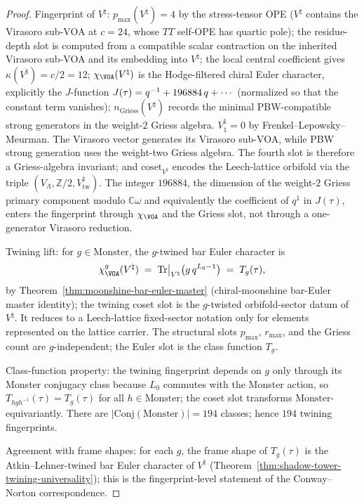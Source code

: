 \begin{proof}
Fingerprint of $V^\natural$: $p_{\max}(V^\natural) = 4$ by the
stress-tensor OPE
\textup{(}$V^\natural$ contains the Virasoro sub-VOA at $c = 24$,
whose $TT$ self-OPE has quartic pole\textup{)};
the residue-depth slot is computed from a compatible scalar
contraction on the inherited Virasoro sub-VOA and its embedding into
$V^\natural$; the local central coefficient gives
$\kappa(V^\natural)=c/2=12$;
$\chi_{\VOA}(V^\natural)$ is the Hodge-filtered chiral Euler
character, explicitly the $J$-function $J(\tau) = q^{-1} +
\textup{196884}\,q + \cdots$ \textup{(}normalized so that the
constant term vanishes\textup{)};
$n_{\mathrm{Griess}}(V^\natural)$ records the minimal
PBW-compatible strong generators in the weight-$2$ Griess algebra.
$V^\natural_1=0$ by Frenkel--Lepowsky--Meurman.  The Virasoro vector
generates its Virasoro sub-VOA, while PBW strong generation uses the
weight-two Griess algebra.  The fourth slot is therefore a
Griess-algebra invariant; and
$\mathrm{coset}_{V^\natural}$ encodes the Leech-lattice orbifold via
the triple $(V_\Lambda, \mathbb{Z}/2, V^\natural_{\mathrm{tw}})$.
The integer $196884$, the dimension of the weight-$2$ Griess
primary component modulo $\mathbb{C}\omega$ and equivalently the
coefficient of $q^1$ in $J(\tau)$, enters the fingerprint through
$\chi_{\VOA}$ and the Griess slot, not through a one-generator
Virasoro reduction.

Twining lift: for $g \in \mathrm{Monster}$, the $g$-twined bar
Euler character is
\begin{equation}
 \chi^g_{\VOA}(V^\natural) \;=\; \mathrm{Tr}\bigl|_{V^\natural}
 \bigl(g\,q^{L_0 - 1}\bigr) \;=\; T_g(\tau),
\end{equation}
by Theorem~\ref{thm:moonshine-bar-euler-master}
\textup{(}chiral-moonshine bar-Euler master identity\textup{)}; the
twining coset slot is the $g$-twisted orbifold-sector datum of
$V^\natural$. It reduces to a Leech-lattice fixed-sector notation
only for elements represented on the lattice carrier. The structural
slots $p_{\max}$, $r_{\max}$, and the Griess count are
$g$-independent; the Euler slot is the class function $T_g$.

Class-function property: the twining fingerprint depends on $g$
only through its Monster conjugacy class because $L_0$ commutes
with the Monster action, so $T_{h g h^{-1}}(\tau) = T_g(\tau)$ for
all $h \in \mathrm{Monster}$; the coset slot transforms
$\mathrm{Monster}$-equivariantly. There are
$|\mathrm{Conj}(\mathrm{Monster})| = 194$ classes; hence $194$
twining fingerprints.

Agreement with frame shapes: for each $g$, the frame shape of
$T_g(\tau)$ is the Atkin--Lehner-twined bar Euler character of
$V^\natural$
\textup{(}Theorem~\ref{thm:shadow-tower-twining-universality}\textup{)};
this is the fingerprint-level statement of the
Conway--Norton correspondence.
\end{proof}

